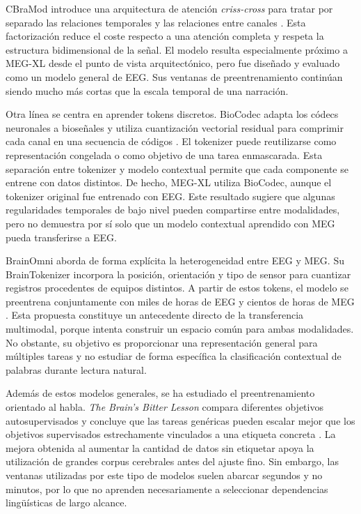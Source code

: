 CBraMod introduce una arquitectura de atención \textit{criss-cross} para tratar por separado las relaciones temporales y las relaciones entre canales \cite{wang2025cbramod}. Esta factorización reduce el coste respecto a una atención completa y respeta la estructura bidimensional de la señal. El modelo resulta especialmente próximo a MEG-XL desde el punto de vista arquitectónico, pero fue diseñado y evaluado como un modelo general de EEG. Sus ventanas de preentrenamiento continúan siendo mucho más cortas que la escala temporal de una narración.

Otra línea se centra en aprender tokens discretos. BioCodec adapta los códecs neuronales a bioseñales y utiliza cuantización vectorial residual para comprimir cada canal en una secuencia de códigos \cite{avramidis2025biocodec}. El tokenizer puede reutilizarse como representación congelada o como objetivo de una tarea enmascarada. Esta separación entre tokenizer y modelo contextual permite que cada componente se entrene con datos distintos. De hecho, MEG-XL utiliza BioCodec, aunque el tokenizer original fue entrenado con EEG. Este resultado sugiere que algunas regularidades temporales de bajo nivel pueden compartirse entre modalidades, pero no demuestra por sí solo que un modelo contextual aprendido con MEG pueda transferirse a EEG.

BrainOmni aborda de forma explícita la heterogeneidad entre EEG y MEG. Su BrainTokenizer incorpora la posición, orientación y tipo de sensor para cuantizar registros procedentes de equipos distintos. A partir de estos tokens, el modelo se preentrena conjuntamente con miles de horas de EEG y cientos de horas de MEG \cite{xiao2025brainomni}. Esta propuesta constituye un antecedente directo de la transferencia multimodal, porque intenta construir un espacio común para ambas modalidades. No obstante, su objetivo es proporcionar una representación general para múltiples tareas y no estudiar de forma específica la clasificación contextual de palabras durante lectura natural.

Además de estos modelos generales, se ha estudiado el preentrenamiento orientado al habla. \textit{The Brain's Bitter Lesson} compara diferentes objetivos autosupervisados y concluye que las tareas genéricas pueden escalar mejor que los objetivos supervisados estrechamente vinculados a una etiqueta concreta \cite{jayalath2025bitter}. La mejora obtenida al aumentar la cantidad de datos sin etiquetar apoya la utilización de grandes corpus cerebrales antes del ajuste fino. Sin embargo, las ventanas utilizadas por este tipo de modelos suelen abarcar segundos y no minutos, por lo que no aprenden necesariamente a seleccionar dependencias lingüísticas de largo alcance.

